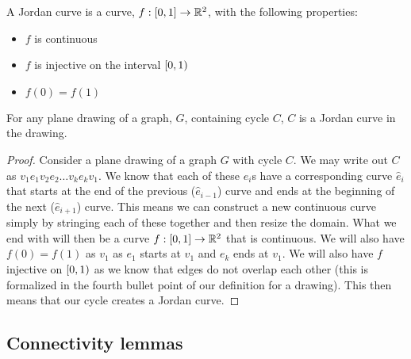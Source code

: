 \documentclass{article}
\begin{document}
\begin{definition}
	A Jordan curve is a curve, $f:\left[ {0} , {1} \right]\to \mathbb R^2$, with the following properties:
	\begin{itemize}
		\item $f$ is continuous
		\item $f$ is injective on the interval $\left[ {0} , {1} \right)$
		\item $f(0) = f(1)$
	\end{itemize}
\end{definition}
\begin{lemma}\label{JordansLemma}
	For any plane drawing of a graph, $G$, containing cycle $C$, $C$ is a Jordan curve in the drawing.
\end{lemma}
\begin{proof}
	Consider a plane drawing of a graph $G$ with cycle $C$. We may write out $C$ as $v_1e_1v_2e_2\ldots v_ke_kv_1$. We know that each of these $e_i$s have a corresponding curve $\hat e_i$ that starts at the end of the previous ($\hat e_{i-1}$) curve and ends at the beginning of the next ($\hat e_{i+1}$) curve. This means we can construct a new continuous curve simply by stringing each of these together and then resize the domain. What we end with will then be a curve $f:\left[ {0} , {1} \right]\to\mathbb R^2$ that is continuous. We will also have $f(0) = f(1)$ as $v_1$ as $e_1$ starts at $v_1$ and $e_k$ ends at $v_1$. We will also have $f$ injective on $\left[ {0} , {1} \right)$ as we know that edges do not overlap each other (this is formalized in the fourth bullet point of our definition for a drawing). This then means that our cycle creates a Jordan curve.
\end{proof}


\subsection{Connectivity lemmas}
\end{document}
